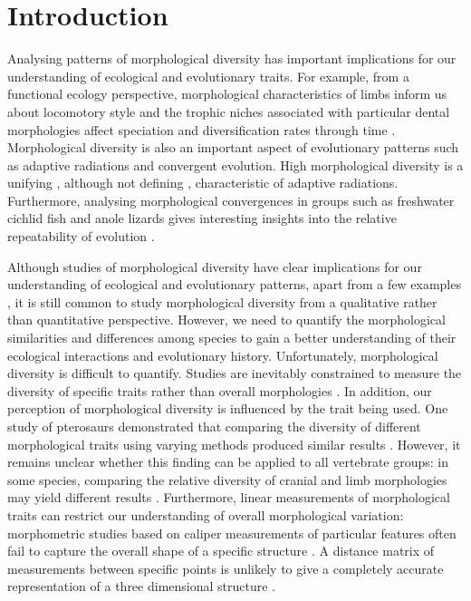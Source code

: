 \chapter{Introduction}
\label{chap:introduction}

\noindent
	Analysing patterns of morphological diversity has important implications for our understanding of ecological and evolutionary traits. For example, from a functional ecology perspective, morphological characteristics of limbs inform us about locomotory style \citep[e.g.][]{Bou1987} and the trophic niches associated with particular dental morphologies affect speciation and diversification rates through time \citep{Price2012}. Morphological diversity is also an important aspect of evolutionary patterns such as adaptive radiations and convergent evolution. High morphological diversity is a unifying \citep{Losos2010a, Olson2009}, although not defining \citep{Glor2010, Olson2009}, characteristic of adaptive radiations. Furthermore, analysing morphological convergences in groups such as freshwater cichlid fish \citep{Muschick2012} and anole lizards \citep{Mahler2013} gives interesting insights into the relative repeatability of evolution \citep{Losos2011}.

	Although studies of morphological diversity have clear implications for our understanding of ecological and evolutionary patterns, apart from a few examples \citep[e.g.][]{Ruta2013, Goswami2011, Brusatte2008}, it is still common to study morphological diversity from a qualitative rather than quantitative perspective. However, we need to quantify the morphological similarities and differences among species to gain a better understanding of their ecological interactions and evolutionary history. Unfortunately, morphological diversity is difficult to quantify. Studies are inevitably constrained to measure the diversity of specific traits rather than overall morphologies \citep{Roy1997}. In addition, our perception of morphological diversity is influenced by the trait being used. One study of pterosaurs demonstrated that comparing the diversity of different morphological traits using varying methods produced similar results \citep{Foth2012}. However, it remains unclear whether this finding can be applied to all vertebrate groups: in some species, comparing the relative diversity of cranial and limb morphologies may yield different results \citep{Foth2012}. Furthermore, linear measurements of morphological traits can restrict our understanding of overall morphological variation:  morphometric studies based on caliper measurements of particular features often fail to capture the overall shape of a specific structure \citep{Slice2007}. A distance matrix of measurements between specific points is unlikely to give a completely accurate representation of a three dimensional structure \citep{Rohlf1993}.
	

